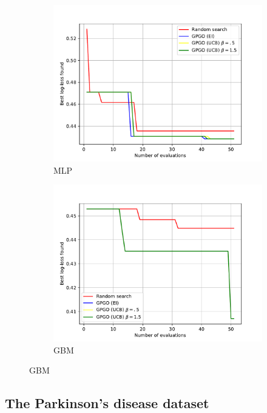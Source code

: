 \documentclass[10pt,a4paper,twoside]{book}
\begin{document}
\begin{figure}[ht]
\begin{subfigure}[t]{0.5\textwidth}
  \end{subfigure}
    \begin{subfigure}[t]{0.5\textwidth}
    \caption{MLP}
    \centering\includegraphics[width=\textwidth]{figures/chapter4/lsvt/mlp}
  \end{subfigure}%
    \begin{subfigure}[t]{0.5\textwidth}
    \caption{GBM}
    \centering\includegraphics[width=\textwidth]{figures/chapter4/lsvt/gbm}
  \end{subfigure}
  \label{fig:breastcancer}
\end{figure}

\subsection{The Parkinson's disease dataset}
\end{document}
